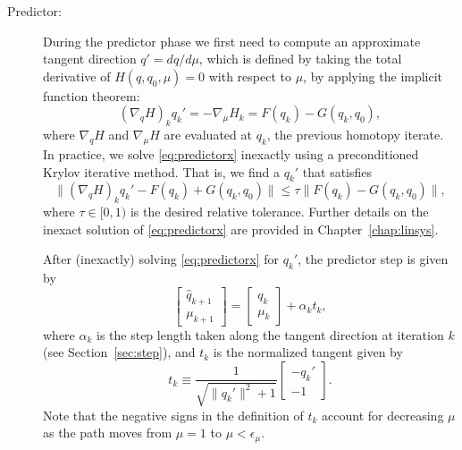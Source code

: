 \begin{description}\label{sec:desp}

  \item[Predictor:] During the predictor phase we first need to compute an
    approximate tangent direction $q' = dq/d\mu$, which is defined by taking the
    total derivative of $H(q,q_0,\mu) = 0$ with respect to $\mu$, \ie by applying the
    implicit function theorem:
    \begin{equation}
      \left(\nabla_q H\right)_{k} q_{k}' = -\nabla_\mu H_{k} = F(q_k)  - G(q_k,q_0), 
      \label{eq:predictorx}
    \end{equation}
    where $\nabla_q H$ and $\nabla_\mu H$ are evaluated at $q_k$, the previous
    homotopy iterate.  In practice, we solve \eqref{eq:predictorx} inexactly
    using a preconditioned Krylov iterative method.  That is, we find a $q_{k}'$
    that satisfies
    \begin{equation*}
      \lVert \left(\nabla_q H\right)_{k} q_{k}' - F(q_k) + G(q_k,q_0) \rVert
      \leq \tau \lVert F(q_k)  - G(q_k,q_0) \rVert,
    \end{equation*}
    where $\tau \in [0,1)$ is the desired relative tolerance.  Further details
      on the inexact solution of \eqref{eq:predictorx} are provided in
      Chapter~\ref{chap:linsys}.
    
    After (inexactly) solving \eqref{eq:predictorx} for $q_{k}'$, the predictor
    step is given by
    \begin{equation}\label{eq:pred}
      \begin{bmatrix}
        \hat{q}_{k+1} \\ \mu_{k+1} 
      \end{bmatrix} 
      = \begin{bmatrix}
        q_k \\ \mu_k 
      \end{bmatrix}      
      + \alpha_{k} t_{k},
    \end{equation}
    where $\alpha_{k}$ is the step length taken along the tangent direction at
    iteration $k$ (see Section~\ref{sec:step}), and $t_k$ is the normalized
    tangent given by
    \begin{equation}\label{eq:tk}
      t_{k} \equiv \frac{1}{\sqrt{\|q_{k}'\|^2 + 1}} \begin{bmatrix} -q_k'
        \\ -1 \end{bmatrix}.
    \end{equation}
    Note that the negative signs in the definition of $t_k$ account for
    decreasing $\mu$ as the path moves from $\mu=1$ to $\mu <
\epsilon_\mu$.


\end{description}
